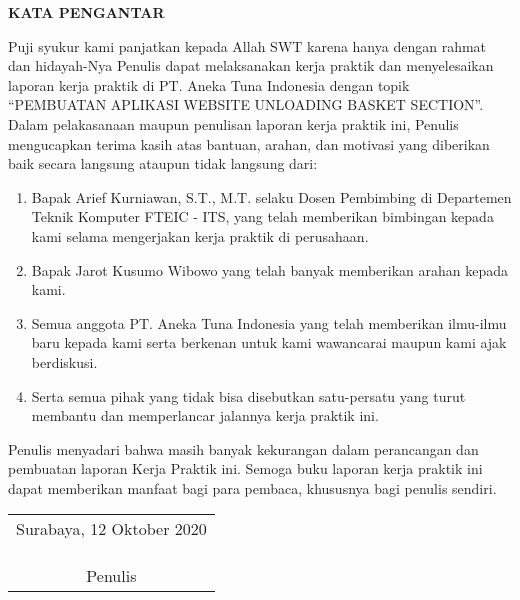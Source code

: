 \begin{center}
  \Large\textbf{KATA PENGANTAR}
\end{center}
\vspace{2ex}


\setlength{\parindent}{7ex}


Puji syukur kami panjatkan kepada Allah SWT karena hanya dengan rahmat dan hidayah-Nya Penulis dapat melaksanakan kerja praktik dan menyelesaikan laporan kerja praktik di PT. Aneka Tuna Indonesia dengan topik “PEMBUATAN APLIKASI WEBSITE UNLOADING BASKET SECTION”.
Dalam pelakasanaan maupun penulisan laporan kerja praktik ini, Penulis mengucapkan terima kasih atas bantuan, arahan, dan motivasi yang diberikan baik secara langsung ataupun tidak langsung dari:
\vspace{0.5ex}

\begin{enumerate}[nolistsep]

  \item Bapak Arief Kurniawan, S.T., M.T. selaku Dosen Pembimbing di Departemen Teknik Komputer FTEIC - ITS, yang telah memberikan bimbingan kepada kami selama mengerjakan kerja praktik di perusahaan.
  \vspace{0.5ex}

  \item Bapak Jarot Kusumo Wibowo yang telah banyak memberikan arahan kepada kami.
  \vspace{0.5ex}

  \item Semua anggota PT. Aneka Tuna Indonesia yang telah memberikan ilmu-ilmu baru kepada kami serta berkenan untuk kami wawancarai maupun kami ajak berdiskusi.
  \vspace{0.5ex}

  \item Serta semua pihak yang tidak bisa disebutkan satu-persatu yang turut membantu dan memperlancar jalannya kerja praktik ini.
  \vspace{0.5ex}

\end{enumerate}
\vspace{0.5ex}

Penulis menyadari bahwa masih banyak kekurangan dalam perancangan dan pembuatan laporan Kerja Praktik ini.
Semoga buku laporan kerja praktik ini dapat memberikan manfaat bagi para pembaca, khususnya bagi penulis sendiri.
\vspace{2ex}

\begin{flushright}
  \begin{tabular}[b]{c}
    Surabaya, 12 Oktober 2020
    \\
    \\
    \\
    \\
    Penulis
  \end{tabular}
\end{flushright}